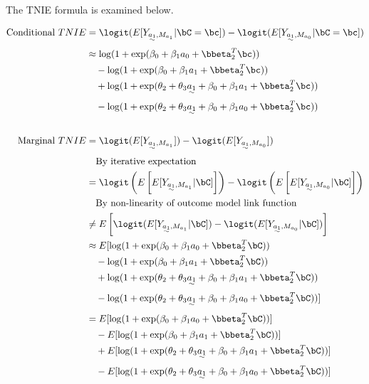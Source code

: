 \documentclass[10pt]{article}
\begin{document}
The TNIE formula is examined below.

\begin{align*}
  \text{Conditional }TNIE
  &= \logit(E[Y_{\uwave{a_{1}},M_{a_{1}}} | \bC = \bc]) - \logit(E[Y_{\uwave{a_{1}},M_{a_{0}}} | \bC = \bc])\\
  &\approx \log(1 + \exp(\beta_{0} + \beta_{1} a_{0} + \bbeta_{2}^T\bc))\\
  &~~~ - \log(1 + \exp(\beta_{0} + \beta_{1} a_{1} + \bbeta_{2}^T\bc))\\
  &~~~ + \log(1 + \exp(\theta_{2} + \theta_{3}\uwave{a_{1}} + \beta_{0} + \beta_{1} a_{1} + \bbeta_{2}^T\bc))\\
  &~~~ - \log(1 + \exp(\theta_{2} + \theta_{3}\uwave{a_{1}} + \beta_{0} + \beta_{1} a_{0} + \bbeta_{2}^T\bc))\\
  \\
  \text{Marginal }TNIE
  &= \logit(E[Y_{\uwave{a_{1}},M_{a_{1}}}]) - \logit(E[Y_{\uwave{a_{1}},M_{a_{0}}}])\\
  &~~~\text{By iterative expectation}\\
  &= \logit\left(E\left[E[Y_{\uwave{a_{1}},M_{a_{1}}} | \bC]\right]\right) - \logit\left(E\left[E[Y_{\uwave{a_{1}},M_{a_{0}}} | \bC]\right]\right)\\
  &~~~\text{By non-linearity of outcome model link function}\\
  &\ne E \left[ \logit(E[Y_{\uwave{a_{1}},M_{a_{1}}} | \bC]) - \logit(E[Y_{\uwave{a_{1}},M_{a_{0}}} | \bC]) \right]\\
  &\approx E[\log(1 + \exp(\beta_{0} + \beta_{1} a_{0} + \bbeta_{2}^T\bC))\\
  &~~~ - \log(1 + \exp(\beta_{0} + \beta_{1} a_{1} + \bbeta_{2}^T\bC))\\
  &~~~ + \log(1 + \exp(\theta_{2} + \theta_{3}\uwave{a_{1}} + \beta_{0} + \beta_{1} a_{1} + \bbeta_{2}^T\bC))\\
  &~~~ - \log(1 + \exp(\theta_{2} + \theta_{3}\uwave{a_{1}} + \beta_{0} + \beta_{1} a_{0} + \bbeta_{2}^T\bC))]\\
  &=     E[\log(1 + \exp(\beta_{0} + \beta_{1} a_{0} + \bbeta_{2}^T\bC))]\\
  &~~~ - E[\log(1 + \exp(\beta_{0} + \beta_{1} a_{1} + \bbeta_{2}^T\bC))]\\
  &~~~ + E[\log(1 + \exp(\theta_{2} + \theta_{3}\uwave{a_{1}} + \beta_{0} + \beta_{1} a_{1} + \bbeta_{2}^T\bC))]\\
  &~~~ - E[\log(1 + \exp(\theta_{2} + \theta_{3}\uwave{a_{1}} + \beta_{0} + \beta_{1} a_{0} + \bbeta_{2}^T\bC))]\\

\end{align*}
\end{document}
